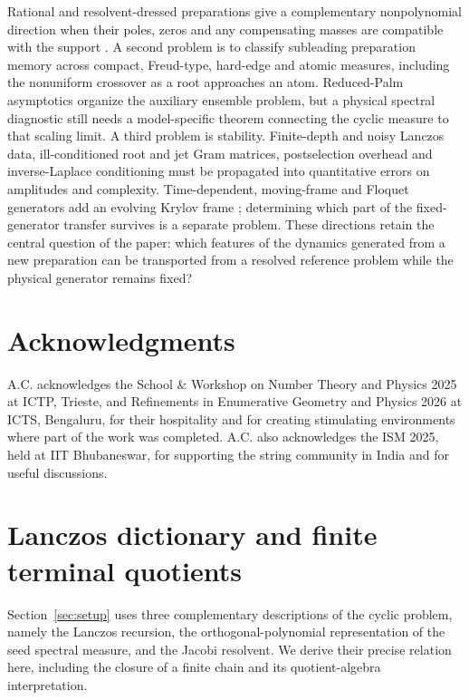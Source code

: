 \documentclass[a4paper,11pt]{article}
\theoremstyle{definition}
\theoremstyle{remark}
\begin{document}
Rational and resolvent-dressed preparations
give a complementary nonpolynomial direction when their poles, zeros and any compensating masses
are compatible with the support \cite{Zhedanov1997,AlishahihaVasli2026KrylovDistribution}.  A second problem is to classify subleading
preparation memory across compact, Freud-type, hard-edge and atomic measures, including the
nonuniform crossover as a root approaches an atom.  Reduced-Palm asymptotics organize the
auxiliary ensemble problem, but a physical spectral diagnostic still needs a model-specific
theorem connecting the cyclic measure to that scaling limit.  A third problem is stability.
Finite-depth and noisy Lanczos data, ill-conditioned root and jet Gram matrices,  postselection overhead and
inverse-Laplace conditioning must be propagated into quantitative errors on amplitudes and
complexity.  Time-dependent, moving-frame and Floquet generators add an evolving Krylov frame
\cite{ChowdhuryMahapatra2024,Grabarits2026}; determining which part of the fixed-generator transfer
survives is a separate problem.  These directions retain the central question of the paper:
which features of the dynamics generated from a new preparation can be transported from
a resolved reference problem while the physical generator remains fixed?

\section*{Acknowledgments}
A.C. acknowledges the School \& Workshop on Number Theory and Physics 2025 at ICTP, Trieste, and Refinements in Enumerative Geometry and Physics 2026 at ICTS, Bengaluru, for their hospitality and for creating stimulating environments where part of the work was completed. A.C. also acknowledges the ISM 2025, held at IIT Bhubaneswar, for supporting the string community in India and for useful discussions. 

\appendix

\section{Lanczos dictionary and finite terminal quotients}
\label{app:lanczos}

Section~\ref{sec:setup} uses three complementary descriptions of the cyclic problem, namely the Lanczos recursion, the orthogonal-polynomial representation of the seed spectral measure, and the Jacobi resolvent. We derive their precise relation here, including the closure of a finite chain and its quotient-algebra interpretation.
\end{document}
